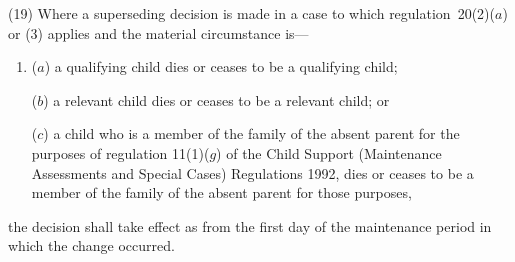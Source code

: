 \documentclass[a4paper,12pt]{article}
\begin{document}
%
%


%

(19) Where a superseding decision is made in a case to which regulation~20(2)($a$)  or (3) applies and the material circumstance is---
\begin{enumerate}\item[]
($a$) a qualifying child dies or ceases to be a qualifying child;

($b$) a relevant child dies or ceases to be a relevant child; or

($c$) a child who is a member of the family of the absent parent for the purposes of regulation 11(1)($g$)  of the Child Support (Maintenance Assessments and Special Cases) Regulations 1992, dies or ceases to be a member of the family of the absent parent for those purposes,
\end{enumerate}
the decision shall take effect as from the first day of the maintenance period in which the change occurred.
\end{document}
